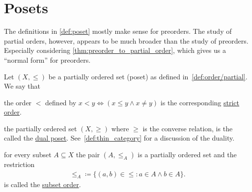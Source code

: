 \section{Posets}\label{sec:posets}

\begin{note}\label{note:preodered_sets_as_posets}
  The definitions in \cref{def:poset} mostly make sense for preorders. The study of partial orders, however, appears to be much broader than the study of preorders. Especially considering \cref{thm:preorder_to_partial_order}, which gives us a \enquote{normal form} for preorders.
\end{note}

\begin{definition}\label{def:poset}
  Let $(X, \leq)$ be a partially ordered set (poset) as defined in~\cref{def:order/partial}. We say that
  \begin{defenum}
    \item\label{def:poset/strict_order} the order $<$ defined by $x < y \iff (x \leq y \land x \neq y)$ is the corresponding \ul{strict order}.

    \item\label{def:poset/dual} the partially ordered set $(X, \geq)$ where $\geq$ is the converse relation, is the called the \ul{dual poset}. See~\cref{def:thin_category} for a discussion of the duality.

    \item\label{def:poset/subset_order} for every subset $A \subseteq X$ the pair $(A, \leq_A)$ is a partially ordered set and the restriction
    \begin{align*}
      \leq_A \coloneqq \{ (a, b) \in \leq \colon a \in A \land b \in A \}.
    \end{align*}
    is called the \ul{subset order}.


\end{defenum}
\end{definition}
